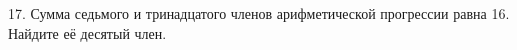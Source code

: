 17. Сумма седьмого и тринадцатого членов арифметической прогрессии равна 16. Найдите её десятый член.\\
